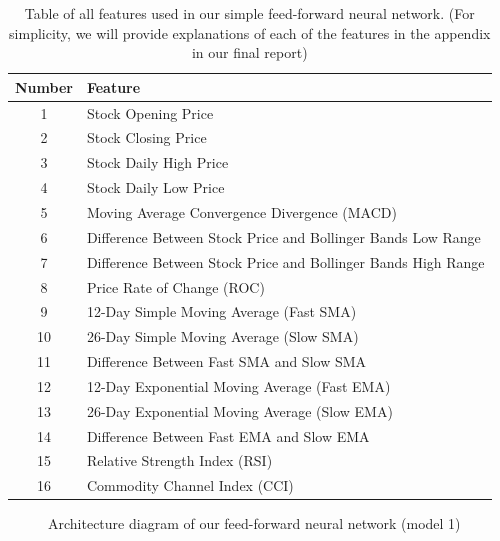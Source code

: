 \documentclass[10pt]{article}
\begin{document}
\begin{table}[H]
\centering
\begin{tabular}{| c | l |} 
\hline
Number & Feature \\
\hline
1 & Stock Opening Price \\
2 & Stock Closing Price \\
3 & Stock Daily High Price \\
4 & Stock Daily Low Price \\
5 & Moving Average Convergence Divergence (MACD) \\
6 & Difference Between Stock Price and Bollinger Bands Low Range \\
7 & Difference Between Stock Price and Bollinger Bands High Range  \\
8 & Price Rate of Change (ROC) \\
9 & 12-Day Simple Moving Average (Fast SMA) \\
10 & 26-Day Simple Moving Average (Slow SMA) \\
11 & Difference Between Fast SMA and Slow SMA \\
12 & 12-Day Exponential Moving Average (Fast EMA) \\
13 & 26-Day Exponential Moving Average (Slow EMA) \\
14 & Difference Between Fast EMA and Slow EMA \\
15 & Relative Strength Index (RSI) \\
16 & Commodity Channel Index (CCI) \\
\hline
\end{tabular}
\caption{Table of all features used in our simple feed-forward neural network. (For simplicity, we will provide explanations of each of the features in the appendix in our final report)}
\label{fffeatures}
\end{table}

\begin{figure}[H]
\centering
{}
\caption{Architecture diagram of our feed-forward neural network (model 1)}
\label{ff}
\end{figure}
\end{document}
